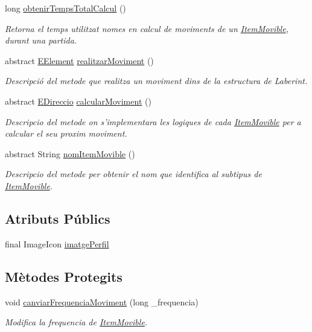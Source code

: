 \begin{DoxyCompactItemize}
\item 
long \hyperlink{classlogica_1_1_item_movible_a1284fadbe7d3961544c7b6edfa69340c}{obtenir\+Temps\+Total\+Calcul} ()
\begin{DoxyCompactList}\small\item\em Retorna el temps utilitzat nomes en calcul de moviments de un \hyperlink{classlogica_1_1_item_movible}{Item\+Movible}, durant una partida. \end{DoxyCompactList}\item 
abstract \hyperlink{enumlogica_1_1enumeracions_1_1_e_element}{E\+Element} \hyperlink{classlogica_1_1_item_movible_aa1d46015999f809171a3ad284e249670}{realitzar\+Moviment} ()
\begin{DoxyCompactList}\small\item\em Descripció del metode que realitza un moviment dins de la estructura de Laberint. \end{DoxyCompactList}\item 
abstract \hyperlink{enumlogica_1_1enumeracions_1_1_e_direccio}{E\+Direccio} \hyperlink{classlogica_1_1_item_movible_a7851f12b803fe2c87550658ce83c6853}{calcular\+Moviment} ()
\begin{DoxyCompactList}\small\item\em Descripcio del metode on s'implementara les logiques de cada \hyperlink{classlogica_1_1_item_movible}{Item\+Movible} per a calcular el seu proxim moviment. \end{DoxyCompactList}\item 
abstract String \hyperlink{classlogica_1_1_item_movible_a2b829b28d6b604e11b8135b78ce8f7eb}{nom\+Item\+Movible} ()
\begin{DoxyCompactList}\small\item\em Descripcio del metode per obtenir el nom que identifica al subtipus de \hyperlink{classlogica_1_1_item_movible}{Item\+Movible}. \end{DoxyCompactList}\end{DoxyCompactItemize}
\subsection*{Atributs Públics}
\begin{DoxyCompactItemize}
\item 
final Image\+Icon \hyperlink{classlogica_1_1_item_movible_a156a60365745803d0d3298b83aeacb73}{imatge\+Perfil}
\end{DoxyCompactItemize}
\subsection*{Mètodes Protegits}
\begin{DoxyCompactItemize}
\item 
void \hyperlink{classlogica_1_1_item_movible_a817da6d1c2d5fce6a874edf3b708f147}{canviar\+Frequencia\+Moviment} (long \+\_\+frequencia)
\begin{DoxyCompactList}\small\item\em Modifica la frequencia de \hyperlink{classlogica_1_1_item_movible}{Item\+Movible}. \end{DoxyCompactList}\end{DoxyCompactItemize}
